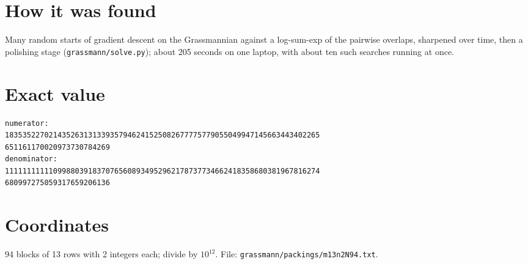\documentclass[11pt,a4paper]{article}
\begin{document}
\section{How it was found}
Many random starts of gradient descent on the Grassmannian against a log-sum-exp of the pairwise overlaps, sharpened over time, then a polishing stage (\texttt{grassmann/solve.py}); about 205 seconds on one laptop, with about ten such searches running at once.


\appendix
\section{Exact value}
{\small
\begin{verbatim}
numerator:
183535227021435263131339357946241525082677775779055049947145663443402265
651161170020973730784269
denominator:
111111111110998803918370765608934952962178737734662418358680381967816274
680997275059317659206136
\end{verbatim}}

\section{Coordinates}
94 blocks of 13 rows with 2 integers each; divide by $10^{12}$. File: \texttt{grassmann/packings/m13n2N94.txt}.
{\tiny
\begin{multicols}{4}
\end{multicols}}
\end{document}

